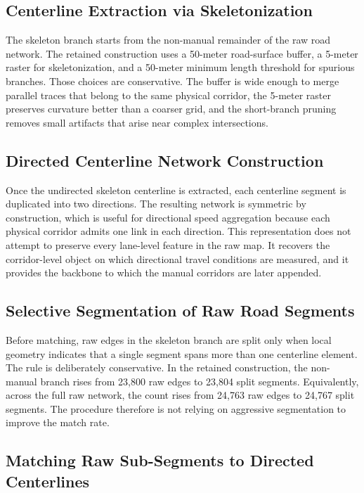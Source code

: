 \documentclass[12pt]{article}
\begin{document}
	\subsection{Centerline Extraction via Skeletonization}
	
	The skeleton branch starts from the non-manual remainder of the raw road network. The retained construction uses a 50-meter road-surface buffer, a 5-meter raster for skeletonization, and a 50-meter minimum length threshold for spurious branches. Those choices are conservative. The buffer is wide enough to merge parallel traces that belong to the same physical corridor, the 5-meter raster preserves curvature better than a coarser grid, and the short-branch pruning removes small artifacts that arise near complex intersections.
	
	\subsection{Directed Centerline Network Construction}
	
	Once the undirected skeleton centerline is extracted, each centerline segment is duplicated into two directions. The resulting network is symmetric by construction, which is useful for directional speed aggregation because each physical corridor admits one link in each direction. This representation does not attempt to preserve every lane-level feature in the raw map. It recovers the corridor-level object on which directional travel conditions are measured, and it provides the backbone to which the manual corridors are later appended.
	
	\subsection{Selective Segmentation of Raw Road Segments}
	
	Before matching, raw edges in the skeleton branch are split only when local geometry indicates that a single segment spans more than one centerline element. The rule is deliberately conservative. In the retained construction, the non-manual branch rises from 23,800 raw edges to 23,804 split segments. Equivalently, across the full raw network, the count rises from 24,763 raw edges to 24,767 split segments. The procedure therefore is not relying on aggressive segmentation to improve the match rate.
	
	
	
	\subsection{Matching Raw Sub-Segments to Directed Centerlines}
	
\end{document}
